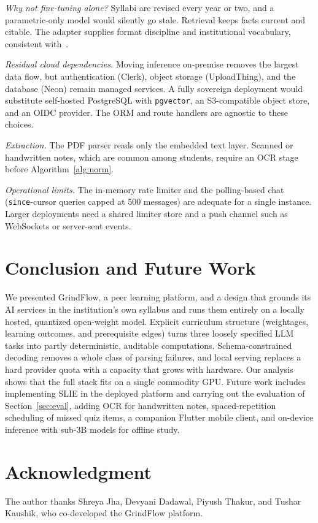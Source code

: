 \documentclass[conference]{IEEEtran}
\begin{document}
\textit{Why not fine-tuning alone?} Syllabi are revised every year or two,
and a parametric-only model would silently go stale. Retrieval keeps facts
current and citable. The adapter supplies format discipline and institutional
vocabulary, consistent with~\cite{ovadia2024finetuning,zhang2024raft}.

\textit{Residual cloud dependencies.} Moving inference on-premise removes the
largest data flow, but authentication (Clerk), object storage (UploadThing),
and the database (Neon) remain managed services. A fully sovereign deployment
would substitute self-hosted PostgreSQL with \texttt{pgvector}, an
S3-compatible object store, and an OIDC provider. The ORM and route handlers
are agnostic to these choices.

\textit{Extraction.} The PDF parser reads only the embedded text layer.
Scanned or handwritten notes, which are common among students, require an OCR
stage before Algorithm~\ref{alg:norm}.

\textit{Operational limits.} The in-memory rate limiter and the polling-based
chat (\texttt{since}-cursor queries capped at 500 messages) are adequate for
a single instance. Larger deployments need a shared limiter store and a push
channel such as WebSockets or server-sent events.

\section{Conclusion and Future Work}
We presented GrindFlow, a peer learning platform, and a design that grounds
its AI services in the institution's own syllabus and runs them entirely on a
locally hosted, quantized open-weight model. Explicit curriculum structure
(weightages, learning outcomes, and prerequisite edges) turns three loosely
specified LLM tasks into partly deterministic, auditable computations.
Schema-constrained decoding removes a whole class of parsing failures, and
local serving replaces a hard provider quota with a capacity that grows with
hardware. Our analysis shows that the full stack fits on a single commodity
GPU. Future work includes implementing SLIE in the deployed platform and
carrying out the evaluation of
Section~\ref{sec:eval}, adding OCR for handwritten notes, spaced-repetition
scheduling of missed quiz items, a companion Flutter mobile client, and
on-device inference with sub-3B models for offline study.

\section*{Acknowledgment}
The author thanks Shreya Jha, Devyani Dadawal, Piyush Thakur, and Tushar
Kaushik, who co-developed the GrindFlow platform.
\end{document}
